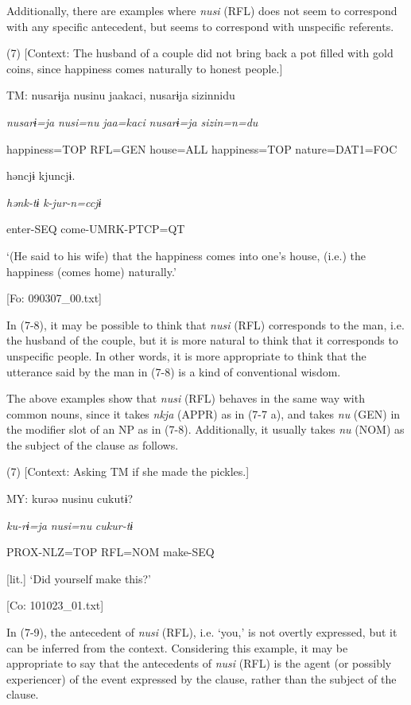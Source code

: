   Additionally, there are examples where \textit{nusi} (RFL) does not seem to correspond with any specific antecedent, but seems to correspond with unspecific referents.

(7)  [Context: The husband of a couple did not bring back a pot filled with gold coins, since happiness comes naturally to honest people.]

  TM:  nusarɨja  nusinu  jaakaci,  nusarɨja  sizinnidu

    \textit{nusarɨ=ja}  \textit{nusi=nu}  \textit{jaa=kaci}  \textit{nusarɨ=ja}  \textit{sizin=n=du}

    happiness=TOP  RFL=GEN  house=ALL  happiness=TOP  nature=DAT1=FOC

    həncjɨ  kjuncjɨ.

    \textit{hənk-tɨ}  \textit{k-jur-n=ccjɨ}

    enter-SEQ  come-UMRK-PTCP=QT

    ‘(He said to his wife) that the happiness comes into one’s house, (i.e.) the happiness (comes home) naturally.’

    [Fo: 090307\_00.txt]

In (7-8), it may be possible to think that \textit{nusi} (RFL) corresponds to the man, i.e. the husband of the couple, but it is more natural to think that it corresponds to unspecific people. In other words, it is more appropriate to think that the utterance said by the man in (7-8) is a kind of conventional wisdom.

  The above examples show that \textit{nusi} (RFL) behaves in the same way with common nouns, since it takes \textit{nkja} (APPR) as in (7-7 a), and takes \textit{nu} (GEN) in the modifier slot of an NP as in (7-8). Additionally, it usually takes \textit{nu} (NOM) as the subject of the clause as follows.

(7)  [Context: Asking TM if she made the pickles.]

  MY:  kurəə  nusinu  cukutɨ?

    \textit{ku-rɨ=ja}  \textit{nusi=nu}  \textit{cukur-tɨ}

    PROX-NLZ=TOP  RFL=NOM  make-SEQ

    [lit.] ‘Did yourself make this?’

    [Co: 101023\_01.txt]

In (7-9), the antecedent of \textit{nusi} (RFL), i.e. ‘you,’ is not overtly expressed, but it can be inferred from the context. Considering this example, it may be appropriate to say that the antecedents of \textit{nusi} (RFL) is the agent (or possibly experiencer) of the event expressed by the clause, rather than the subject of the clause.


